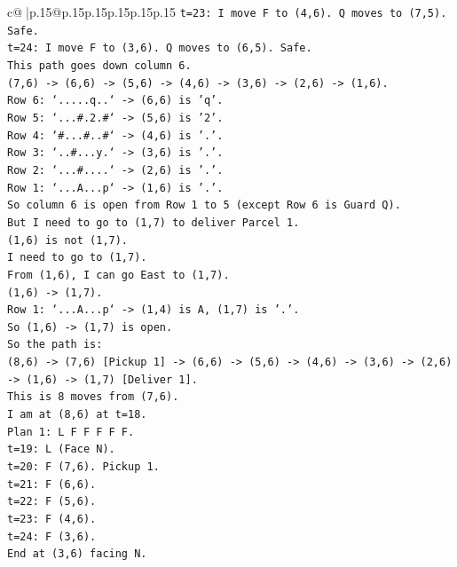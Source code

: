 \documentclass{article}
\begin{document}
{\begin{supertabular}{c@{$\;$}|p{.15\linewidth}@{}p{.15\linewidth}p{.15\linewidth}p{.15\linewidth}p{.15\linewidth}p{.15\linewidth}}
{{{\texttt{t=23: I move F to (4,6). Q moves to (7,5). Safe.} \\
\texttt{t=24: I move F to (3,6). Q moves to (6,5). Safe.} \\
\texttt{This path goes down column 6.} \\
\texttt{(7,6) {-}> (6,6) {-}> (5,6) {-}> (4,6) {-}> (3,6) {-}> (2,6) {-}> (1,6).} \\
\texttt{Row 6: `.....q..` {-}> (6,6) is 'q'.} \\
\texttt{Row 5: `...\#.2.\#` {-}> (5,6) is '2'.} \\
\texttt{Row 4: `\#...\#..\#` {-}> (4,6) is '.'.} \\
\texttt{Row 3: `..\#...y.` {-}> (3,6) is '.'.} \\
\texttt{Row 2: `...\#....` {-}> (2,6) is '.'.} \\
\texttt{Row 1: `...A...p` {-}> (1,6) is '.'.} \\
\texttt{So column 6 is open from Row 1 to 5 (except Row 6 is Guard Q).} \\
\texttt{But I need to go to (1,7) to deliver Parcel 1.} \\
\texttt{(1,6) is not (1,7).} \\
\texttt{I need to go to (1,7).} \\
\texttt{From (1,6), I can go East to (1,7).} \\
\texttt{(1,6) {-}> (1,7).} \\
\texttt{Row 1: `...A...p` {-}> (1,4) is A, (1,7) is '.'.} \\
\texttt{So (1,6) {-}> (1,7) is open.} \\
\texttt{So the path is:} \\
\texttt{(8,6) {-}> (7,6) {[}Pickup 1{]} {-}> (6,6) {-}> (5,6) {-}> (4,6) {-}> (3,6) {-}> (2,6) {-}> (1,6) {-}> (1,7) {[}Deliver 1{]}.} \\
\texttt{This is 8 moves from (7,6).} \\
\texttt{I am at (8,6) at t=18.} \\
\texttt{Plan 1: L F F F F F.} \\
\texttt{t=19: L (Face N).} \\
\texttt{t=20: F (7,6). Pickup 1.} \\
\texttt{t=21: F (6,6).} \\
\texttt{t=22: F (5,6).} \\
\texttt{t=23: F (4,6).} \\
\texttt{t=24: F (3,6).} \\
\texttt{End at (3,6) facing N.} \\
}}}
\end{supertabular}}
\end{document}
